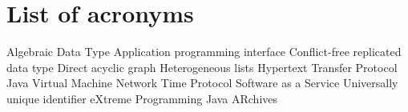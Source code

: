 \chapter{List of acronyms}

{\small
\begin{acronym}[XXXXXXXX]
        {Algebraic Data Type}
        {Application programming interface}
       {Conflict-free replicated data type}
        {Direct acyclic graph}
      {Heterogeneous lists}
       {Hypertext Transfer Protocol}
        {Java Virtual Machine}
        {Network Time Protocol}
       {Software as a Service}
       {Universally unique identifier}
         {eXtreme Programming}
        {Java ARchives}
\end{acronym}
}


